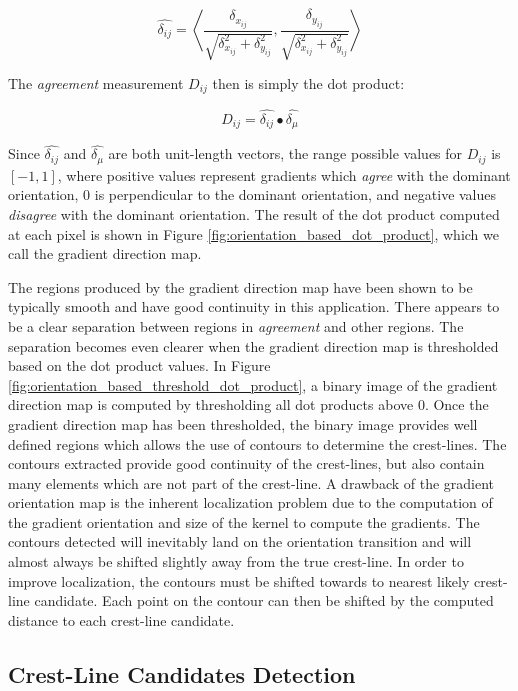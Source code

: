 \begin{equation}
\hat{\delta_{ij}} = \left\langle \frac{\delta_{x_{ij}}}{\sqrt{\delta_{x_{ij}}^2 + \delta_{y_{ij}}^2}}, \frac{\delta_{y_{ij}}}{\sqrt{\delta_{x_{ij}}^2 + \delta_{y_{ij}}^2}}\right\rangle 
\end{equation}

The \emph{agreement} measurement $D_{ij}$ then is simply the dot product:

\begin{equation}
D_{ij} = \hat{\delta_{ij}} \bullet \hat{\delta_{\mu}}
\end{equation}

Since $\hat{\delta_{ij}}$ and $\hat{\delta_{\mu}}$ are both unit-length vectors, the range possible values for $D_{ij}$ is $[-1, 1]$, where positive values represent gradients which \emph{agree} with the dominant orientation, 0 is perpendicular to the dominant orientation, and negative values \emph{disagree} with the dominant orientation. The result of the dot product computed at each pixel is shown in Figure \ref{fig:orientation_based_dot_product}, which we call the gradient direction map.

The regions produced by the gradient direction map have been shown to be typically smooth and have good continuity in this application. There appears to be a clear separation between regions in \emph{agreement} and other regions. The separation becomes even clearer when the gradient direction map is thresholded based on the dot product values. In Figure \ref{fig:orientation_based_threshold_dot_product}, a binary image of the gradient direction map is computed by thresholding all dot products above 0. Once the gradient direction map has been thresholded, the binary image provides well defined regions which allows the use of contours to determine the crest-lines. The contours extracted provide good continuity of the crest-lines, but also contain many elements which are not part of the crest-line. A drawback of the gradient orientation map is the inherent localization problem due to the computation of the gradient orientation and size of the kernel to compute the gradients. The contours detected will inevitably land on the orientation transition and will almost always be shifted slightly away from the true crest-line. In order to improve localization, the contours must be shifted towards to nearest likely crest-line candidate. Each point on the contour can then be shifted by the computed distance to each crest-line candidate.


\subsection{ Crest-Line Candidates Detection } \label{subsec:crest_line_candidate_detection}

